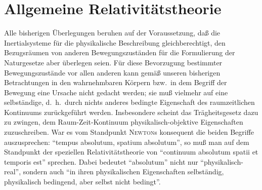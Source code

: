 %
%

\section{Allgemeine Relativitätstheorie}
\label{sec:all-1}

Alle bisherigen Überlegungen beruhen auf der Voraussetzung, daß die Inertialsysteme für die physikalische
Beschreibung gleichberechtigt, den Bezugsräumen von
anderen Bewegungszuständen für die Formulierung der
Naturgesetze aber überlegen seien. Für diese Bevorzugung bestimmter Bewegungszustände vor allen anderen kann gemäß unseren bisherigen Betrachtungen in
den wahrnehmbaren Körpern bzw.\ in dem Begriff der
Bewegung eine Ursache nicht gedacht werden; sie muß
vielmehr auf eine selbständige, d.\ h.\ durch nichts anderes bedingte Eigenschaft des raumzeitlichen Kontinuums
zurückgeführt werden. Insbesondere scheint das Trägheitsgesetz dazu zu zwingen, dem Raum-Zeit-Kontinuum physikalisch-objektive Eigenschaften zuzuschreiben. War es vom Standpunkt \textsc{Newton}s konsequent
die beiden Begriffe auszusprechen: \enquote{tempus absolutum,
spatium absolutum}, so muß man auf dem Standpunkt
der speziellen Relativitätstheorie von \enquote{continuum absolutum spatii et temporis est} sprechen. Dabei bedeutet
\enquote{absolutum} nicht nur \enquote{physikalisch-real}, sondern
auch \enquote{in ihren physikalischen Eigenschaften selbständig,
physikalisch bedingend, aber selbst nicht bedingt}.